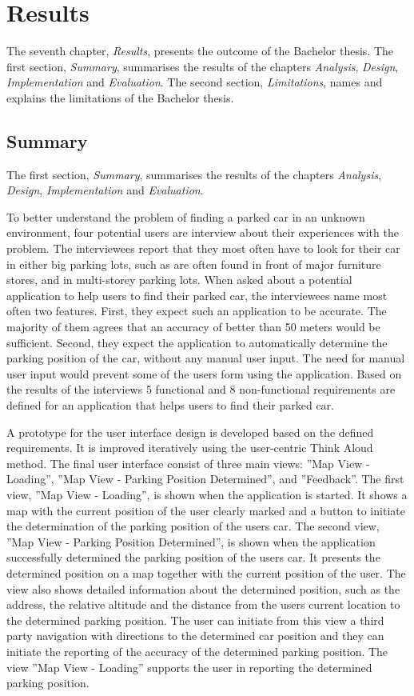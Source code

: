 \chapter{Results}
The seventh chapter, \textit{Results}, presents the outcome of the Bachelor thesis. The first section, \textit{Summary}, summarises the results of the chapters \textit{Analysis}, \textit{Design}, \textit{Implementation} and \textit{Evaluation}. The second section, \textit{Limitations}, names and explains the limitations of the Bachelor thesis. 

\section{Summary}
The first section, \textit{Summary}, summarises the results of the chapters \textit{Analysis}, \textit{Design}, \textit{Implementation} and \textit{Evaluation}.

To better understand the problem of finding a parked car in an unknown environment, four potential users are interview about their experiences with the problem. The interviewees report that they most often have to look for their car in either big parking lots, such as are often found in front of major furniture stores, and in multi-storey parking lots. When asked about a potential application to help users to find their parked car, the interviewees name most often two features. First, they expect such an application to be accurate. The majority of them agrees that an accuracy of better than 50 meters would be sufficient. Second, they expect the application to automatically determine the parking position of the car, without any manual user input. The need for manual user input would prevent some of the users form using the application. Based on the results of the interviews 5 functional and 8 non-functional requirements are defined for an application that helps users to find their parked car. 

A prototype for the user interface design is developed based on the defined requirements. It is improved iteratively using the user-centric Think Aloud method. The final user interface consist of three main views: ''Map View - Loading'', ''Map View - Parking Position Determined'', and ''Feedback''. The first view, ''Map View - Loading'', is shown when the application is started. It shows a map with the current position of the user clearly marked and a button to initiate the determination of the parking position of the users car. The second view, ''Map View - Parking Position Determined'', is shown when the application successfully determined the parking position of the users car. It presents the determined position on a map together with the current position of the user. The view also shows detailed information about the determined position, such as the address, the relative altitude and the distance from the users current location to the determined parking position. The user can initiate from this view a third party navigation with directions to the determined car position and they can initiate the reporting of the accuracy of the determined parking position. The view ''Map View - Loading'' supports the user in reporting the determined parking position.

